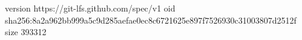 version https://git-lfs.github.com/spec/v1
oid sha256:8a2a962bb999a5c9d285aefae0ec8c6721625e897f7526930c31003807d2512f
size 393312
